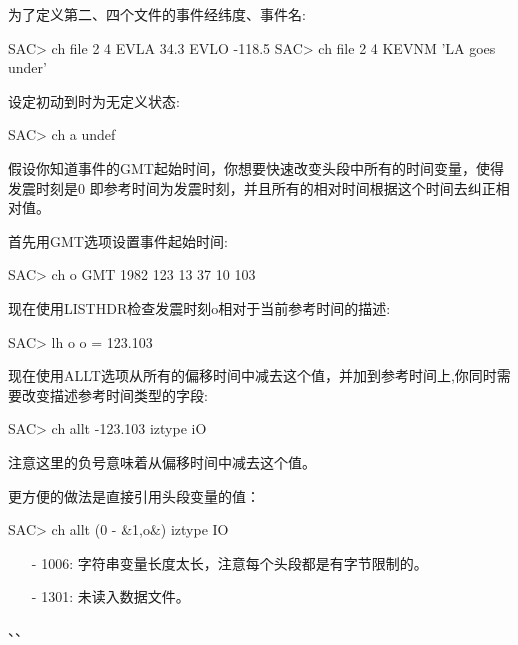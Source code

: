 为了定义第二、四个文件的事件经纬度、事件名:
\begin{SACCode}
SAC> ch file 2 4 EVLA 34.3 EVLO -118.5
SAC> ch file 2 4 KEVNM 'LA goes under'
\end{SACCode}

设定初动到时为无定义状态:
\begin{SACCode}
SAC> ch a undef
\end{SACCode}

假设你知道事件的GMT起始时间，你想要快速改变头段中所有的时间变量，使得发震时刻是0
即参考时间为发震时刻，并且所有的相对时间根据这个时间去纠正相对值。

首先用GMT选项设置事件起始时间:
\begin{SACCode}
SAC> ch o GMT 1982 123 13 37 10 103
\end{SACCode}
现在使用LISTHDR检查发震时刻o相对于当前参考时间的描述:
\begin{SACCode}
SAC> lh o
 o = 123.103
\end{SACCode}
现在使用ALLT选项从所有的偏移时间中减去这个值，并加到参考时间上,你同时需要改变描述参考时间类型的字段:
\begin{SACCode}
SAC> ch allt -123.103 iztype iO
\end{SACCode}
注意这里的负号意味着从偏移时间中减去这个值。

更方便的做法是直接引用头段变量的值：
\begin{SACCode}
SAC> ch allt (0 - &1,o&) iztype IO
\end{SACCode}

\begin{itemize}
\item[-]1006: 字符串变量长度太长，注意每个头段都是有字节限制的。
\item[-]1301: 未读入数据文件。
\end{itemize}

、、
